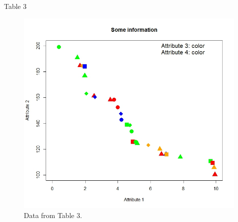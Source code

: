 \documentclass[
  ignorenonframetext,
]{beamer}
\begin{document}
\begin{frame}{Table 3}
\protect\hypertarget{table-3}{}
\begin{figure}
\includegraphics[width=0.85\linewidth]{intro_figs/tab3} \caption{Data from Table 3.}\label{fig:unnamed-chunk-3}
\end{figure}
\end{frame}
\end{document}
